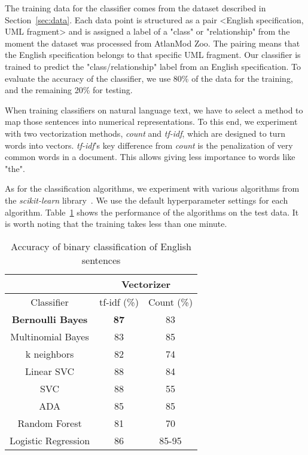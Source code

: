 \documentclass[sigconf]{acmart}
\begin{document}
The training data for the classifier comes from the dataset described in Section~\ref{sec:data}. Each data point is structured as a pair <English specification, UML fragment> and is assigned a label of a "class" or "relationship" from the moment the dataset was processed from AtlanMod Zoo. The pairing means that the English specification belongs to that specific UML fragment. Our classifier is trained to predict the "class/relationship" label from an English specification. To evaluate the accuracy of the classifier, we use 80\% of the data for the training, and the remaining 20\% for testing.

When training classifiers on natural language text, we have to select a method to map those sentences into numerical representations. To this end, we experiment with two vectorization methods, \textit{count} and \textit{tf-idf}, which are designed to turn words into vectors. \textit{tf-idf}'s key difference from \textit{count} is the penalization of very common words in a document. This allows giving less importance to words like "the".

As for the classification algorithms, we experiment with various algorithms from the \textit{scikit-learn} library~\cite{scikit-learn}. We use the default hyperparameter settings for each algorithm. Table~\ref{tab:classifier-performance} shows the performance of the algorithms on the test data. It is worth noting that the training takes less than one minute. 

\begin{table}[h]
    \centering
    \begin{tabular}{|c|c|c|}
        \hline
         & \multicolumn{2}{|c|}{Vectorizer} \\ \hline
        Classifier & tf-idf (\%) & Count (\%) \\ \hline
    \textbf{Bernoulli Bayes}     &   \textbf{87}  &  83 \\ \hline
    Multinomial Bayes   &   83  &  85 \\ \hline
    k neighbors        &   82  &   74 \\ \hline
    Linear SVC          &   88  &   84 \\ \hline
    SVC                 &   88  &   55 \\ \hline
    ADA                 &   85  &   85 \\ \hline
    Random Forest       &   81  &   70 \\ \hline
    Logistic Regression &   86  &   85-95 \\ \hline
    \end{tabular}
    \caption{Accuracy of binary classification of English sentences}
    \label{tab:classifier-performance}
\end{table}
\end{document}

